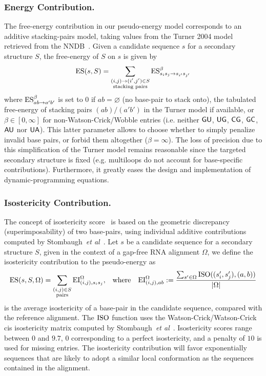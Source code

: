\subsubsection{Energy Contribution.}
The free-energy contribution in our pseudo-energy model corresponds to an additive stacking-pairs model, taking values from the Turner 2004 model retrieved from the NNDB~\cite{Turner2010}. Given a candidate sequence $s$ for a secondary structure $S$, the free-energy of $S$ on $s$ is given by
\begin{align*}
  \text{ES}(s,S) = \sum_{\substack{(i,j)\to (i',j')\in S\\ \text{stacking pairs}}}\text{ES}^{\beta}_{s_is_j\to s_{i'}s_{j'}} 
\end{align*}
where $\text{ES}^{\beta}_{ab\to a'b'}$ is set to $0$ if $ab=\varnothing$ (no base-pair to stack onto), the tabulated free-energy of stacking pairs $(ab)/(a'b')$ in the Turner model if available, or $\beta\in[0,\infty]$ for non-Watson-Crick/Wobble entries (i.e. neither ${\sf{G}}{\sf{U}}$, ${\sf{U}}{\sf{G}}$, ${\sf{C}}{\sf{G}}$, ${\sf{G}}{\sf{C}}$, ${\sf{A}}{\sf{U}}$ nor ${\sf{U}}{\sf{A}}$). This latter parameter allows to choose whether to simply penalize invalid base pairs, or forbid them altogether ($\beta = \infty$).
The loss of precision due to this simplification of the Turner model remains reasonable since the targeted secondary structure is fixed 
(e.g. multiloops do not account for base-specific contributions). Furthermore, it greatly eases the design and implementation of dynamic-programming equations. 
\subsubsection{Isostericity Contribution.}
The concept of isostericity score~\cite{Stombaugh2009} is based on the geometric discrepancy (superimposability) of two base-pairs, using individual additive contributions computed by Stombaugh~\emph{et al}~\cite{Stombaugh2009}. Let $s$ be a candidate sequence for a secondary structure $S$, given in the context of a gap-free RNA alignment $\Omega$,  we define the isostericity contribution to the pseudo-energy as
\begin{align*}
  \text{ES}(s,S,\Omega) &= \sum_{\substack{(i,j)\in S\\ \text{pairs}}}\text{EI}^{\Omega}_{(i,j),s_i s_j}, & \text{where}&& 	\text{EI}^{\Omega}_{(i,j),ab}:=
	\frac{
		\sum_{s'\in\Omega}
			\text{\text{ISO}}((s_i',s_j'),(a,b))}
{		
		|\Omega|
	}
\end{align*}
is the average isostericity of a base-pair in the candidate sequence, compared with the reference alignment.
The $\text{ISO}$ function uses the {Watson-Crick/Watson-Crick} cis isostericity matrix computed by Stombaugh~\emph{et al}~\cite{Stombaugh2009}. Isostericity scores range between $0$ and $9.7$, $0$ corresponding to a perfect isostericity, and a penalty of $10$ is used for missing entries.
The isostericity contribution will favor exponentially sequences that are likely to adopt a similar local conformation as the sequences contained in the alignment.

